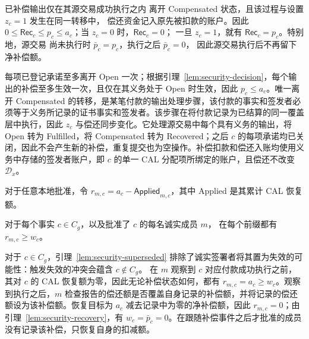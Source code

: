 \begin{lemma}[源交易偿还]
\label{lem:security-recovery}
已补偿输出仅在其源交易成功执行之内
离开 Compensated 状态，且该过程与设置 $z_c=1$ 发生在同一转移中，
偿还资金记入原先被扣款的账户。因此
$0\le\mathsf{Rec}_c\le p_c\le a_c$；当 $z_c=0$ 时，$\mathsf{Rec}_c=0$；
一旦 $z_c=1$，就有 $\mathsf{Rec}_c=p_c$。特别地，源交易
尚未执行时 $\bar p_c=p_c$，执行之后 $\bar p_c=0$，
因此源交易执行后不再留下净补偿额。
\end{lemma}
\begin{IEEEproof}
每项已登记承诺至多离开 Open 一次；根据引理~\ref{lem:security-decision}，每个输出的补偿至多生效一次，且仅在其义务处于 Open 时生效，因此 $p_c\le a_c$。唯一离开 Compensated 的转移，是某笔付款的输出处理步骤，该付款的事实和签发者必须等于义务所记录的证书事实和签发者。该步骤在将付款记录为已结算的同一覆盖层中执行，因此 $z_c$ 与偿还同步变化。它处理源交易中每个具有义务的输出，将 Open 转为 Fulfilled，将 Compensated 转为 Recovered；之后 $c$ 的每项承诺均已关闭，因此不会产生新的补偿，重复提交也为空操作。补偿扣款和偿还入账均使用义务中存储的签发者账户，即 $c$ 的单一 CAL 分配项所绑定的账户，且偿还不改变 $\mathcal D_x$。
\end{IEEEproof}

对于任意本地批准，令 $r_{m,c}=a_c-\mathsf{Applied}_{m,c}$，其中 Applied 是其累计 CAL 恢复额。

\begin{lemma}[残留容量]
\label{lem:security-witness}
对于每个事实 $c\in C_g$，以及批准了 $c$ 的每名诚实成员 $m$，
在每个前缀都有
$r_{m,c}\ge w_c$。
\end{lemma}
\begin{IEEEproof}
对于 $c\in C_g$，引理~\ref{lem:security-superseded} 排除了诚实签署者将其置为失效的可能性：触发失效的冲突会蕴含 $c\notin C_g$。
在 $m$ 观察到 $c$ 对应付款成功执行之前，其对 $c$ 的 CAL 恢复额为零，因此无论补偿状态如何，都有 $r_{m,c}=a_c\ge w_c$。观察到执行之后，$m$ 检查报告的偿还额是否覆盖自身记录的补偿额，并将记录的偿还额设为该补偿额。恢复目标为 $a_c$ 减去记录中为零的净补偿额，因此 $r_{m,c}=0$；由引理~\ref{lem:security-recovery}，有 $w_c=\bar p_c=0$。在跟随补偿事件之后才批准的成员没有记录该补偿，只恢复自身的扣减额。
\end{IEEEproof}

